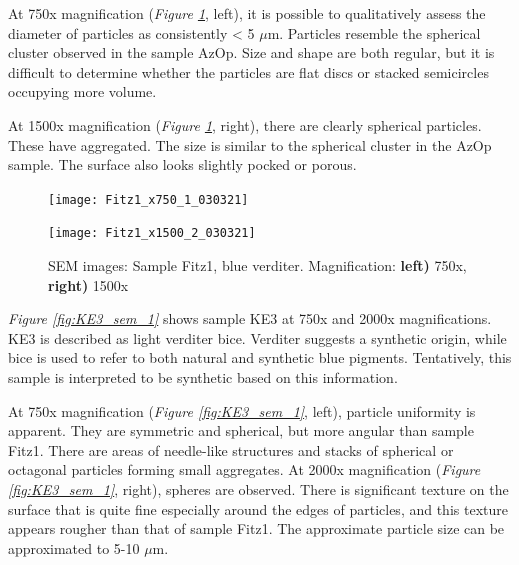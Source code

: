At 750x magnification (\textit{Figure \ref{fig:Fitz1_sem_1}}, left), it is possible to qualitatively assess the diameter of particles as consistently < 5 $\mu$m. Particles resemble the spherical cluster observed in the sample AzOp. Size and shape are both regular, but it is difficult to determine whether the particles are flat discs or stacked semicircles occupying more volume.

At 1500x magnification (\textit{Figure \ref{fig:Fitz1_sem_1}}, right), there are clearly spherical particles. These have aggregated. The size is similar to the spherical cluster in the AzOp sample. The surface also looks slightly pocked or porous. 

\begin{figure}[H]
\centering
\begin{minipage}{.45\textwidth}
  \centering
  \texttt{[image: Fitz1\_x750\_1\_030321]}
\end{minipage}
\begin{minipage}{.45\textwidth}
  \centering
  \texttt{[image: Fitz1\_x1500\_2\_030321]}
\end{minipage}
\caption[SEM images: Sample Fitz1, blue verditer]{SEM images: Sample Fitz1, blue verditer. Magnification: \textbf{left)} 750x, \textbf{right)} 1500x}
\label{fig:Fitz1_sem_1}
\end{figure}



\textit{Figure \ref{fig:KE3_sem_1}} shows sample KE3 at 750x and 2000x magnifications. KE3 is described as light verditer bice. Verditer suggests a synthetic origin, while bice is used to refer to both natural and synthetic blue pigments. Tentatively, this sample is interpreted to be synthetic based on this information.

At 750x magnification (\textit{Figure \ref{fig:KE3_sem_1}}, left), particle uniformity is apparent. They are symmetric and spherical, but more angular than sample Fitz1. There are areas of needle-like structures and stacks of spherical or octagonal particles forming small aggregates. At 2000x magnification (\textit{Figure \ref{fig:KE3_sem_1}}, right), spheres are observed. There is significant texture on the surface that is quite fine especially around the edges of particles, and this texture appears rougher than that of sample Fitz1. The approximate particle size can be approximated to 5-10 $\mu$m.

